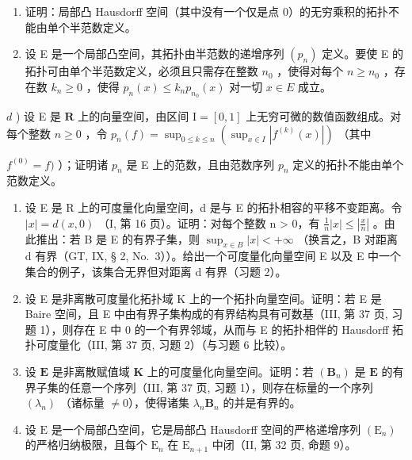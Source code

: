 \begin{enumerate}
\def\labelenumi{\alph{enumi})}
\setcounter{enumi}{1}
\item
  证明：局部凸 Hausdorff 空间（其中没有一个仅是点 0）的无穷乘积的拓扑不能由单个半范数定义。
\item
  设 E 是一个局部凸空间，其拓扑由半范数的递增序列 \((p_n)\) 定义。要使 E 的拓扑可由单个半范数定义，必须且只需存在整数 \(n_0\) ，使得对每个 \(n \geqslant n_0\) ，存在数 \(k_n \geqslant 0\) ，使得 \(p_n(x) \leqslant k_n p_{n_0}(x)\) 对一切 \(x \in E\) 成立。
\end{enumerate}

\(d\) ) 设 E 是 \(\mathbf{R}\) 上的向量空间，由区间 \(\mathrm{I} = [0,1]\) 上无穷可微的数值函数组成。对每个整数 \(n\geqslant 0\) ，令 \(p_n(f) = \sup_{0\leqslant k\leqslant n}\left(\sup_{x\in I}|f^{(k)}(x)|\right)\) （其中

\(f^{(0)} = f)\) ）；证明诸 \(p_n\) 是 E 上的范数，且由范数序列 \(p_n\) 定义的拓扑不能由单个范数定义。

\begin{enumerate}
\def\labelenumi{\arabic{enumi})}
\setcounter{enumi}{2}
\item
  设 E 是 R 上的可度量化向量空间，d 是与 E 的拓扑相容的平移不变距离。令 \(|x| = d(x, 0)\) （I, 第 16 页）。证明：对每个整数 n \textgreater{} 0，有 \(\frac{1}{n}|x| \leqslant \left|\frac{x}{n}\right|\) 。由此推出：若 B 是 E 的有界子集，则 \(\sup_{x \in B} |x| < +\infty\) （换言之，B 对距离 d 有界（GT, IX, § 2, No.~3））。给出一个可度量化向量空间 E 以及 E 中一个集合的例子，该集合无界但对距离 d 有界（习题 2）。
\item
  设 E 是非离散可度量化拓扑域 K 上的一个拓扑向量空间。证明：若 E 是 Baire 空间，且 E 中由有界子集构成的有界结构具有可数基（III, 第 37 页, 习题 1），则存在 E 中 0 的一个有界邻域，从而与 E 的拓扑相伴的 Hausdorff 拓扑可度量化（III, 第 37 页, 习题 2）（与习题 6 比较）。
\item
  设 \(\mathbf{E}\) 是非离散赋值域 \(\mathbf{K}\) 上的可度量化向量空间。证明：若 \((\mathbf{B}_n)\) 是 \(\mathbf{E}\) 的有界子集的任意一个序列（III, 第 37 页, 习题 1），则存在标量的一个序列 \((\lambda_n)\) （诸标量 \(\neq 0\)），使得诸集 \(\lambda_n\mathbf{B}_n\) 的并是有界的。
\item
  设 \(\mathrm{E}\) 是一个局部凸空间，它是局部凸 Hausdorff 空间的严格递增序列 \((\mathrm{E}_n)\) 的严格归纳极限，且每个 \(\mathrm{E}_n\) 在 \(\mathrm{E}_{n+1}\) 中闭（II, 第 32 页, 命题 9）。
\end{enumerate}

